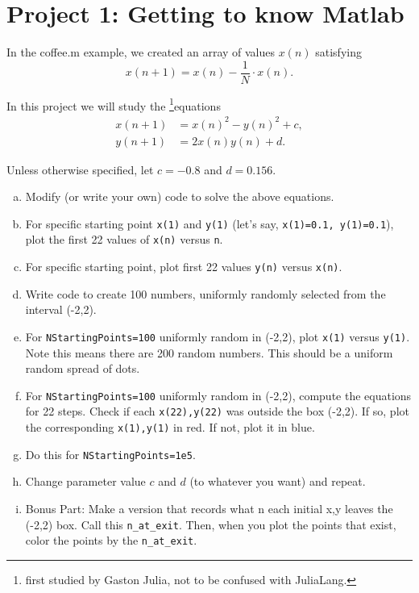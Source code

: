 \documentclass{exam}
\begin{document}
\section*{Project 1: Getting to know Matlab}
 


In the coffee.m example, we created an array of values $x(n)$ satisfying
\begin{equation}
x(n+1) = x(n)-\frac{1}{N}\cdot x(n).
\end{equation}

In this project we will study the \footnote{first studied by Gaston Julia, not to be confused with JuliaLang.}{equations}
\begin{align}
x(n+1) &= x(n)^2 - y(n)^2 + c,\\
y(n+1) &= 2x(n) y(n) + d.
\end{align} 

Unless otherwise specified, let $c= -0.8$ and $d =0.156$.


\begin{enumerate}[a.]
\item Modify (or write your own) code to solve the above equations.
\item For specific starting point \verb|x(1)| and \verb|y(1)| (let's say, \verb|x(1)=0.1, y(1)=0.1|), plot the first 22 values of \verb|x(n)| versus \verb|n|.
\item For specific starting point, plot first 22 values \verb|y(n)| versus \verb|x(n)|.
\item Write code to create 100 numbers, uniformly randomly selected from the interval (-2,2). 
\item For \verb|NStartingPoints=100| uniformly random in (-2,2),  plot \verb|x(1)| versus \verb|y(1)|. Note this means there are 200 random numbers. This should be a uniform random spread of dots. 
\item For \verb|NStartingPoints=100| uniformly random in (-2,2), compute the equations for 22 steps. Check if each \verb|x(22),y(22)| was outside the box (-2,2). If so, plot the corresponding \verb|x(1),y(1)| in red. If not, plot it in blue. 
\item Do this for \verb|NStartingPoints=1e5|.  
\item Change parameter value $c$ and $d$ (to whatever you want) and repeat.
\item Bonus Part: Make a version that records what n each initial x,y leaves the (-2,2) box. Call this \verb|n_at_exit|. Then, when you plot the points that exist, color the points by the \verb|n_at_exit|.
\end{enumerate}




\end{document}
